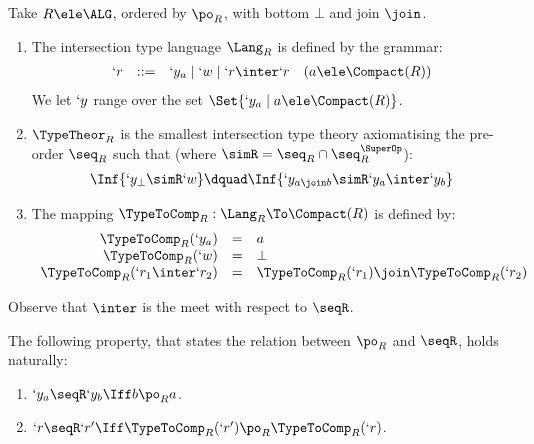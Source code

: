 \documentclass{CSML}
\begin{document}
 \begin{defi} \label{def:typeTHeorFromDomain}
Take $R \ele \ALG$, ordered by $\po_R$, with bottom $\bot$ and join $\join$.

 \begin{enumerate}

 \item 
The intersection type language $\Lang_R$ is defined by the grammar:
%
 \[ \begin{array}{rcl@{\quad}l}
`r & :: = & `y_a \mid `w \mid `r \inter `r & (a \ele \Compact(R))
 \end{array} \]
We let $`y$ range over the set $\Set {`y_a \mid a \ele \Compact(R)}$.

 \item $\TypeTheor_R$ is the smallest intersection type theory axiomatising the pre-order $\seq_R$ such that (where $\simR = \seq_R \cap \seq^{\SuperOp}_R$):
%
 \[ \begin{array}{c@{\dquad}c}
\Inf	{`y_ \bot \simR `w}
	&
\Inf	{`y_{a \join b} \simR `y_a \inter `y_b}
 \end{array} \]

 \item 
The mapping $ \TypeToComp_R: \Lang_R\To\Compact(R)$ is defined by:
%
 \[ \begin{array}{rcl}
 \TypeToComp_R(`y_a) &=& a \\ 
 \TypeToComp_R(`w) &=& \bot \\ 
 \TypeToComp_R(`r_1 \inter `r_2) &=& \TypeToComp_R(`r_1) \join \TypeToComp_R(`r_2) 
 \end{array} \]

 \end{enumerate}
Observe that $\inter$ is the meet with respect to $\seqR$.
 \end{defi}

The following property, that states the relation between $\po_R$ and $\seqR$, holds naturally:

 \begin{lem} \label{lem:KRtheory}\hfill
 \begin{enumerate}
 \item \label{lem:KRtheory-1}
	$`y_a \seqR `y_b \Iff b \po_R a$.

 \item \label{lem:KRtheory-2}
	$`r \seqR `r' \Iff \TypeToComp_R(`r') \po_R \TypeToComp_R(`r)$.

 \end{enumerate}
 \end{lem}
\end{document}
